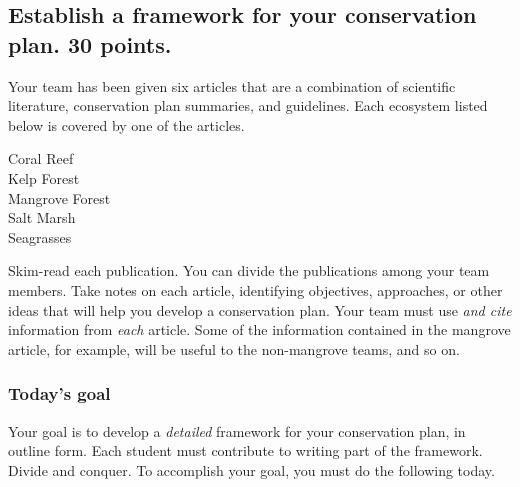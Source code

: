 \documentclass[12pt, hidelinks]{exam}
\begin{document}
\subsection*{Establish a framework for your conservation plan. 30 points.}

Your team has been given six articles that are a combination of scientific literature, conservation plan summaries, and guidelines.  Each ecosystem listed below is covered by one of the articles.

\begin{multicols}{2}

Coral Reef\\ 
Kelp Forest\\ 
Mangrove Forest\\
Salt Marsh\\
Seagrasses

\end{multicols}

Skim-read each publication. You can divide the publications among your team members. Take notes on each article, identifying objectives, approaches, or other ideas that will help you develop a conservation plan. Your team must use \emph{and cite} information from \emph{each} article. Some of the information contained in the mangrove article, for example, will be useful to the non-mangrove teams, and so on. 

\subsubsection*{Today's goal}

Your goal is to develop a \emph{detailed} framework for your conservation plan, in outline form. Each student must contribute to writing part of the framework. Divide and conquer. To accomplish your goal, you must do the following today.
\end{document}
